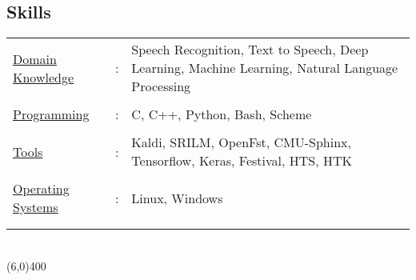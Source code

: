 \documentclass[line,margin]{res}
\begin{document}
\begin{resume}
\section{Skills}
\small
   \begin{tabular}{l c p{3in}}\vspace{-4mm}
   \hspace{-3mm} \underline{Domain Knowledge} & :&   Speech Recognition, Text to Speech, Deep Learning, Machine Learning, Natural Language Processing \\ \\ \vspace{-4mm}
   \hspace{-3mm} \underline{Programming} & :&   C, C++, Python, Bash, Scheme \\ \\ \vspace{-4mm}
   \hspace{-3mm} \underline{Tools} & :&   Kaldi, SRILM, OpenFst, CMU-Sphinx, Tensorflow, Keras, Festival, HTS, HTK \\ \\ \vspace{-4mm}
   \hspace{-3mm} \underline{Operating Systems} & :& Linux, Windows\\ \\\vspace{-4mm}
 \end{tabular}
\normalsize
\\


\line(6,0){400}

\normalsize

\end{resume}
\end{document}
